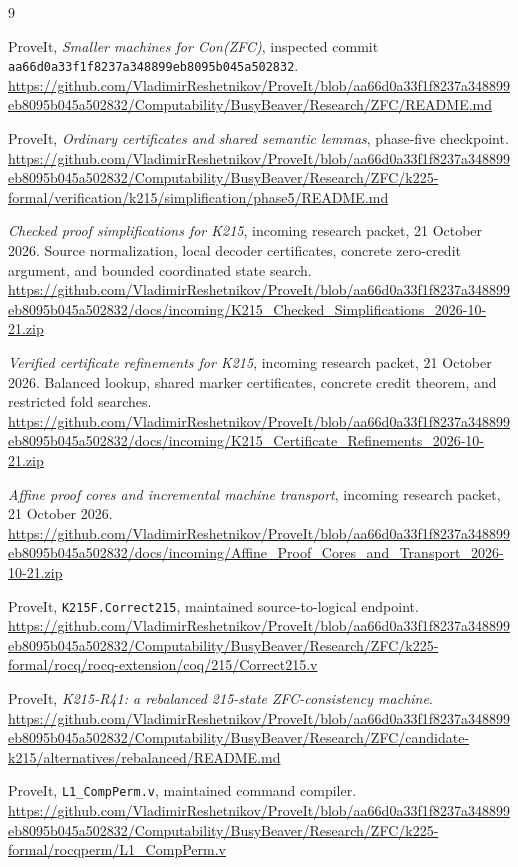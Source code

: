 \documentclass[11pt]{article}
\newcommand{\code}[1]{\texttt{#1}}
\theoremstyle{remark}
\begin{document}
\begin{thebibliography}{9}
\small\raggedright
{}
ProveIt, \emph{Smaller machines for Con(ZFC)}, inspected commit
\code{aa66d0a33f1f8237a348899eb8095b045a502832}.
\url{https://github.com/VladimirReshetnikov/ProveIt/blob/aa66d0a33f1f8237a348899eb8095b045a502832/Computability/BusyBeaver/Research/ZFC/README.md}

ProveIt, \emph{Ordinary certificates and shared semantic lemmas},
phase-five checkpoint.
\url{https://github.com/VladimirReshetnikov/ProveIt/blob/aa66d0a33f1f8237a348899eb8095b045a502832/Computability/BusyBeaver/Research/ZFC/k225-formal/verification/k215/simplification/phase5/README.md}

\emph{Checked proof simplifications for K215},
incoming research packet, 21 October 2026. Source normalization,
local decoder certificates, concrete zero-credit argument, and bounded
coordinated state search.
\url{https://github.com/VladimirReshetnikov/ProveIt/blob/aa66d0a33f1f8237a348899eb8095b045a502832/docs/incoming/K215_Checked_Simplifications_2026-10-21.zip}

\emph{Verified certificate refinements for K215},
incoming research packet, 21 October 2026. Balanced lookup, shared marker
certificates, concrete credit theorem, and restricted fold searches.
\url{https://github.com/VladimirReshetnikov/ProveIt/blob/aa66d0a33f1f8237a348899eb8095b045a502832/docs/incoming/K215_Certificate_Refinements_2026-10-21.zip}

\emph{Affine proof cores and incremental machine transport},
incoming research packet, 21 October 2026.
\url{https://github.com/VladimirReshetnikov/ProveIt/blob/aa66d0a33f1f8237a348899eb8095b045a502832/docs/incoming/Affine_Proof_Cores_and_Transport_2026-10-21.zip}

ProveIt, \code{K215F.Correct215}, maintained source-to-logical endpoint.
\url{https://github.com/VladimirReshetnikov/ProveIt/blob/aa66d0a33f1f8237a348899eb8095b045a502832/Computability/BusyBeaver/Research/ZFC/k225-formal/rocq/rocq-extension/coq/215/Correct215.v}

ProveIt, \emph{K215-R41: a rebalanced 215-state ZFC-consistency machine}.
\url{https://github.com/VladimirReshetnikov/ProveIt/blob/aa66d0a33f1f8237a348899eb8095b045a502832/Computability/BusyBeaver/Research/ZFC/candidate-k215/alternatives/rebalanced/README.md}

ProveIt, \code{L1\_CompPerm.v}, maintained command compiler.
\url{https://github.com/VladimirReshetnikov/ProveIt/blob/aa66d0a33f1f8237a348899eb8095b045a502832/Computability/BusyBeaver/Research/ZFC/k225-formal/rocqperm/L1_CompPerm.v}
\end{thebibliography}
\end{document}
